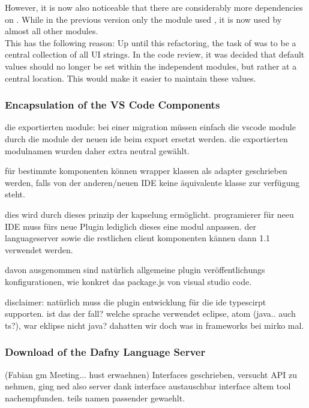 However, it is now also noticeable that there are considerably more dependencies on .
While in the previous version only the module  used , it is now used by almost all other modules.\\

This has the following reason: Up until this refactoring, the task of  was to be a central collection of all UI strings.  
In the code review, it was decided that default values should no longer be set within the independent modules,
but rather at a central location.
This would make it easier to maintain these values.

\subsubsection{Encapsulation of the VS Code Components}

die exportierten module:
bei einer migration müssen einfach die vscode module durch die module der neuen ide beim export ersetzt werden.
die exportierten modulnamen wurden daher extra neutral gewählt.

für bestimmte komponenten können wrapper klassen als adapter geschrieben werden, falls von
der anderen/neuen IDE keine äquivalente klasse zur verfügung steht.

dies  wird durch dieses prinzip der kapselung ermöglicht.
programierer für neeu IDE muss fürs neue Plugin lediglich dieses eine modul anpassen.
der languageserver sowie die restlichen client komponenten kännen dann 1.1 verwendet werden.

davon ausgenommen sind natürlich allgemeine plugin veröffentlichungs konfigurationen, wie konkret
das package.js von visual studio code.

disclaimer: natürlich muss die plugin entwicklung für die ide typescirpt supporten.
ist das der fall? welche sprache verwendet eclipse, atom (java.. auch ts?),
war eklipse nicht java? dahatten wir doch was in frameworks bei mirko mal.

\subsubsection{Download of the Dafny Language Server}
\label{section:implementation:client:download}
  (Fabian gm Meeting... hust erwaehnen)
Interfaces geschrieben, versucht API zu nehmen, ging ned also server
dank interface austauschbar
interface altem tool nachempfunden. teils namen passender gewaehlt.

